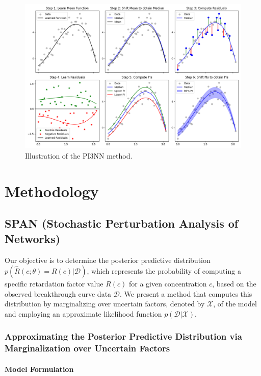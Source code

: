 \begin{figure}[h]
    \centering
    \includegraphics{figs/3pinn_illustration.png}
    \caption{Illustration of the PI3NN method.}
    \label{fig:3pinn_illustration}
\end{figure}





\section{Methodology}
\subsection{SPAN (Stochastic Perturbation Analysis of Networks)}
Our objective is to determine the posterior predictive distribution $p(\hat{R}(c; \theta) = R(c)| \mathcal{D})$, which represents the probability of computing a specific retardation factor value $R(c)$ for a given concentration $c$, based on the observed breakthrough curve data $\mathcal{D}$. We present a method that computes this distribution by marginalizing over uncertain factors, denoted by $\mathcal{X}$, of the model and employing an approximate likelihood function $p(\mathcal{D} | \mathcal{X})$.

\subsubsection{Approximating the Posterior Predictive Distribution via Marginalization over Uncertain Factors}

\paragraph{Model Formulation}

